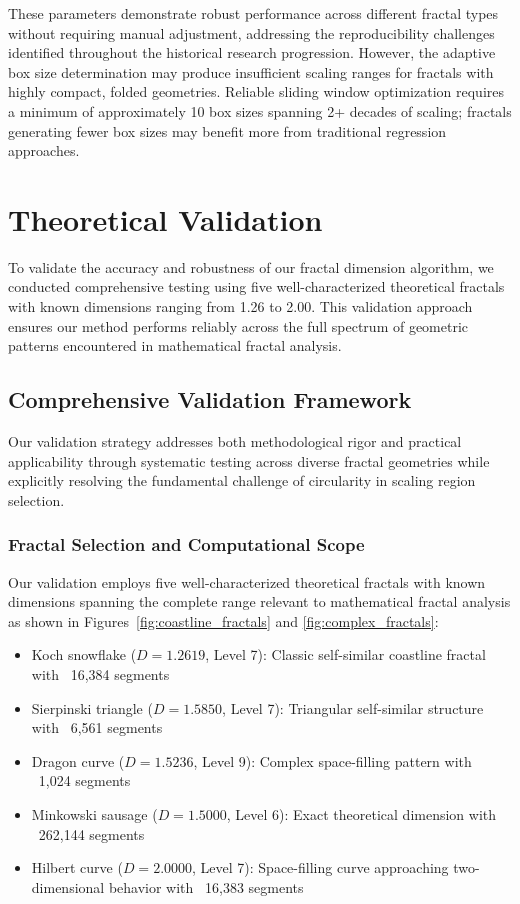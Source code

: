 \documentclass[preprint,12pt]{elsarticle}
\def\textbf#1{#1}%
\begin{document}
These parameters demonstrate robust performance across different fractal types without requiring manual adjustment, addressing the reproducibility challenges identified throughout the historical research progression. However, the adaptive box size determination may produce insufficient scaling ranges for fractals with highly compact, folded geometries. Reliable sliding window optimization requires a minimum of approximately 10 box sizes spanning 2+ decades of scaling; fractals generating fewer box sizes may benefit more from traditional regression approaches.

\section{Theoretical Validation}

To validate the accuracy and robustness of our fractal dimension algorithm, we conducted comprehensive testing using five well-characterized theoretical fractals with known dimensions ranging from 1.26 to 2.00. This validation approach ensures our method performs reliably across the full spectrum of geometric patterns encountered in mathematical fractal analysis.

\subsection{Comprehensive Validation Framework}
\label{subsec:validation_framework}

Our validation strategy addresses both methodological rigor and practical applicability through systematic testing across diverse fractal geometries while explicitly resolving the fundamental challenge of circularity in scaling region selection.

\subsubsection{Fractal Selection and Computational Scope}

Our validation employs five well-characterized theoretical fractals with known dimensions spanning the complete range relevant to mathematical fractal analysis as shown in Figures~\ref{fig:coastline_fractals} and \ref{fig:complex_fractals}:

\begin{itemize}
\item \textbf{Koch snowflake} ($D = 1.2619$, Level 7): Classic self-similar coastline fractal with ~16,384 segments
\item \textbf{Sierpinski triangle} ($D = 1.5850$, Level 7): Triangular self-similar structure with ~6,561 segments
\item \textbf{Dragon curve} ($D = 1.5236$, Level 9): Complex space-filling pattern with ~1,024 segments
\item \textbf{Minkowski sausage} ($D = 1.5000$, Level 6): Exact theoretical dimension with ~262,144 segments
\item \textbf{Hilbert curve} ($D = 2.0000$, Level 7): Space-filling curve approaching two-dimensional behavior with ~16,383 segments
\end{itemize}
\end{document}
